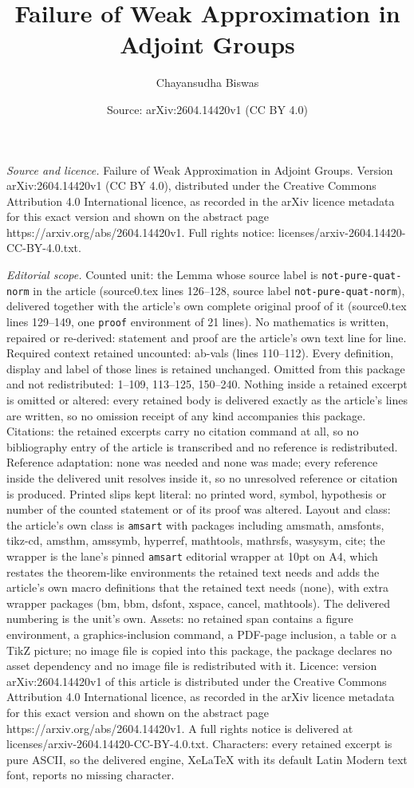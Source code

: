 \documentclass[10pt,a4paper]{amsart}
\title[Failure of Weak Approximation in Adjoint Groups]{Failure of Weak Approximation in Adjoint Groups}
\author{Chayansudha Biswas}
\date{Source: arXiv:2604.14420v1 (CC BY 4.0)}
\begin{document}
\maketitle

\noindent\emph{Source and licence.} Failure of Weak Approximation in Adjoint Groups. Version arXiv:2604.14420v1 (CC BY 4.0), distributed under the Creative Commons Attribution 4.0 International licence, as recorded in the arXiv licence metadata for this exact version and shown on the abstract page https://arxiv.org/abs/2604.14420v1. Full rights notice: licenses/arxiv-2604.14420-CC-BY-4.0.txt.\par\smallskip

\noindent\textit{Editorial scope.} Counted unit: the Lemma whose source label is \texttt{not-pure-quat-norm} in the article (source0.tex lines 126--128, source label \texttt{not-pure-quat-norm}), delivered together with the article's own complete original proof of it (source0.tex lines 129--149, one \texttt{proof} environment of 21 lines). No mathematics is written, repaired or re-derived: statement and proof are the article's own text line for line. Required context retained uncounted: ab-vals (lines 110--112). Every definition, display and label of those lines is retained unchanged. Omitted from this package and not redistributed: 1--109, 113--125, 150--240. Nothing inside a retained excerpt is omitted or altered: every retained body is delivered exactly as the article's lines are written, so no omission receipt of any kind accompanies this package. Citations: the retained excerpts carry no citation command at all, so no bibliography entry of the article is transcribed and no reference is redistributed. Reference adaptation: none was needed and none was made; every reference inside the delivered unit resolves inside it, so no unresolved reference or citation is produced. Printed slips kept literal: no printed word, symbol, hypothesis or number of the counted statement or of its proof was altered. Layout and class: the article's own class is \texttt{amsart} with packages including amsmath, amsfonts, tikz-cd, amsthm, amssymb, hyperref, mathtools, mathrsfs, wasysym, cite; the wrapper is the lane's pinned \texttt{amsart} editorial wrapper at 10pt on A4, which restates the theorem-like environments the retained text needs and adds the article's own macro definitions that the retained text needs (none), with extra wrapper packages (bm, bbm, dsfont, xspace, cancel, mathtools). The delivered numbering is the unit's own. Assets: no retained span contains a figure environment, a graphics-inclusion command, a PDF-page inclusion, a table or a TikZ picture; no image file is copied into this package, the package declares no asset dependency and no image file is redistributed with it. Licence: version arXiv:2604.14420v1 of this article is distributed under the Creative Commons Attribution 4.0 International licence, as recorded in the arXiv licence metadata for this exact version and shown on the abstract page https://arxiv.org/abs/2604.14420v1. A full rights notice is delivered at licenses/arxiv-2604.14420-CC-BY-4.0.txt. Characters: every retained excerpt is pure ASCII, so the delivered engine, XeLaTeX with its default Latin Modern text font, reports no missing character.
\end{document}
